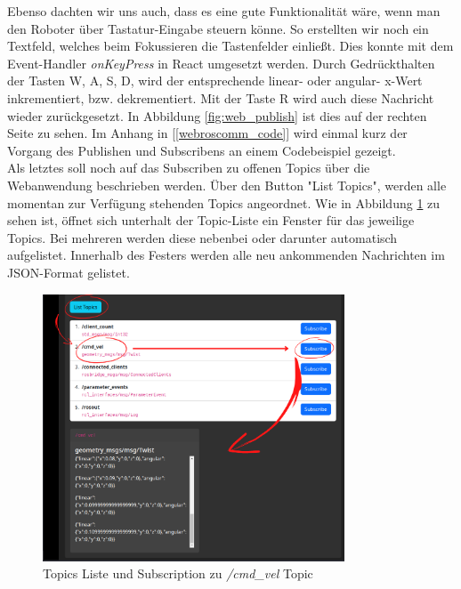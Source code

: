 \begin{flushleft}
Ebenso dachten wir uns auch, dass es eine gute Funktionalität wäre, wenn man den Roboter über Tastatur-Eingabe steuern könne.
So erstellten wir noch ein Textfeld, welches beim Fokussieren die Tastenfelder einließt.
Dies konnte mit dem Event-Handler \textit{onKeyPress} in React umgesetzt werden.
Durch Gedrückthalten der Tasten W, A, S, D, wird der entsprechende linear- oder angular- x-Wert inkrementiert, bzw. dekrementiert.
Mit der Taste R wird auch diese Nachricht wieder zurückgesetzt.
In Abbildung \ref{fig:web_publish} ist dies auf der rechten Seite zu sehen.
Im Anhang in [\ref{webroscomm_code}] wird einmal kurz der Vorgang des Publishen und Subscribens an einem Codebeispiel gezeigt.
\\

\vspace{0.5cm}
Als letztes soll noch auf das Subscriben zu offenen Topics über die Webanwendung beschrieben werden.
Über den Button "List Topics", werden alle momentan zur Verfügung stehenden Topics angeordnet. 
Wie in Abbildung \ref{fig:web_subscribe} zu sehen ist, öffnet sich unterhalt der Topic-Liste ein Fenster für das jeweilige Topics. 
Bei mehreren werden diese nebenbei oder darunter automatisch aufgelistet. 
Innerhalb des Festers werden alle neu ankommenden Nachrichten im JSON-Format gelistet.

\begin{figure}[h!]
    \centering
    \includegraphics[width=0.8\textwidth]{imgs/web/web_subscribe.png}
    \caption{Topics Liste und Subscription zu \textit{/cmd\_vel} Topic}
    \label{fig:web_subscribe}%
\end{figure}

\end{flushleft}
    